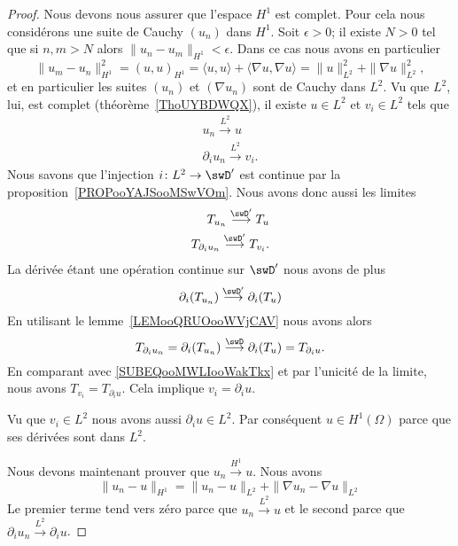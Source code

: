 \begin{proof}
    Nous devons nous assurer que l'espace \( H^1\) est complet. Pour cela nous considérons une suite de Cauchy \( (u_n)\) dans \( H^1\). Soit \( \epsilon>0\); il existe \( N>0\) tel que si \( n,m>N\) alors \( \| u_n-u_m \|_{H^1}<\epsilon\). Dans ce cas nous avons en particulier
    \begin{equation}
        \| u_m-u_n \|_{H^1}^2=(u,u)_{H^1}=\langle u, u\rangle +\langle \nabla u, \nabla u\rangle =\| u \|_{L^2}^2+\| \nabla u \|_{L^2}^2,
    \end{equation}
    et en particulier les suites \( (u_n)\) et \( (\nabla u_n)\) sont de Cauchy dans \( L^2\). Vu que \( L^2\), lui, est complet (théorème~\ref{ThoUYBDWQX}), il existe \( u\in L^2\) et \( v_i\in L^2\) tels que
    \begin{subequations}
        \begin{align}
            u_n\stackrel{L^2}{\longrightarrow}u\\
            \partial_iu_n\stackrel{L^2}{\longrightarrow}v_i.
        \end{align}
    \end{subequations}
    Nous savons que l'injection \( i\colon L^2\to \swD'\) est continue par la proposition~\ref{PROPooYAJSooMSwVOm}. Nous avons donc aussi les limites
    \begin{subequations}
        \begin{align}
            T_{u_n}\stackrel{\swD'}{\longrightarrow}T_u\\
            T_{\partial_i u_n}\stackrel{\swD'}{\longrightarrow}T_{v_i}.     \label{SUBEQooMWLIooWakTkx}
        \end{align}
    \end{subequations}
    La dérivée étant une opération continue sur \( \swD'\) nous avons de plus
    \begin{equation}
        \partial_i(T_{u_n})\stackrel{\swD'}{\longrightarrow}\partial_i(T_u)
    \end{equation}
    En utilisant le lemme~\ref{LEMooQRUOooWVjCAV} nous avons alors
    \begin{equation}
        T_{\partial_iu_n}=\partial_i(T_{u_n})\stackrel{\swD}{\longrightarrow}\partial_i(T_u)=T_{\partial_iu}.
    \end{equation}
    En comparant avec \eqref{SUBEQooMWLIooWakTkx} et par l'unicité de la limite, nous avons \( T_{v_i}=T_{\partial_iu}\). Cela implique \( v_i=\partial_iu\).

    Vu que \( v_i\in L^2\) nous avons aussi \( \partial_iu\in L^2\). Par conséquent \( u\in H^1(\Omega)\) parce que ses dérivées sont dans \( L^2\).

    Nous devons maintenant prouver que \( u_n\stackrel{H^1}{\longrightarrow}u\). Nous avons
    \begin{equation}
        \| u_n-u \|_{H^1}=\| u_n -u\|_{L^2}+\| \nabla u_n-\nabla u \|_{L^2}
    \end{equation}
    Le premier terme tend vers zéro parce que \( u_n\stackrel{L^2}{\longrightarrow}u\) et le second parce que \( \partial_iu_n\stackrel{L^2}{\longrightarrow}\partial_iu\).
\end{proof}

